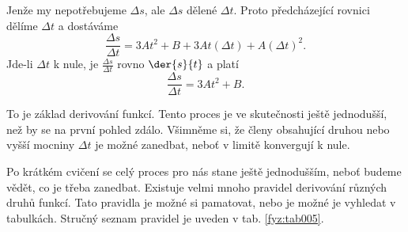     Jenže my nepotřebujeme \(\Delta s\), ale \(\Delta s\) dělené \(\Delta t\). Proto předcházející 
    rovnici dělíme \(\Delta t\) a dostáváme
    \begin{equation}\label{fyz:eq121}
       \frac{\Delta s}{\Delta t} = 3At^2 + B + 3At(\Delta t) + A(\Delta t)^2.
    \end{equation}
    Jde-li \(\Delta t\) k nule, je \(\frac{\Delta s}{\Delta t}\) rovno \(\der{s}{t}\) a platí
    \begin{equation}\label{fyz:eq122}
       \frac{\Delta s}{\Delta t} = 3At^2 + B.
    \end{equation}
    
    To je základ derivování funkcí. Tento proces je ve skutečnosti ještě jednodušší, než by se na 
    první pohled zdálo. Všimněme si, že členy obsahující druhou nebo vyšší mocniny \(\Delta t\) je 
    možné zanedbat, neboť v limitě konvergují k nule.
    
    Po krátkém cvičení se celý proces pro nás stane ještě jednodušším, neboť budeme vědět, co je 
    třeba zanedbat. Existuje velmi mnoho pravidel derivování různých druhů funkcí. Tato pravidla je 
    možné si pamatovat, nebo je možné je vyhledat v tabulkách. Stručný seznam pravidel je uveden v 
    tab. \ref{fyz:tab005}.
  
